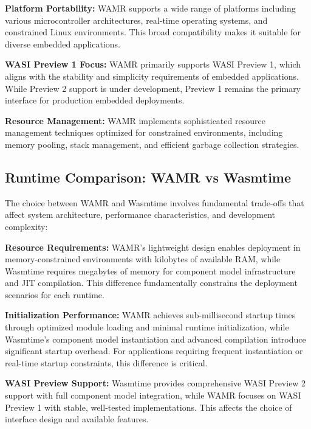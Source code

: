\textbf{Platform Portability:} WAMR supports a wide range of platforms including various microcontroller architectures, real-time operating systems, and constrained Linux environments. This broad compatibility makes it suitable for diverse embedded applications.

\textbf{WASI Preview 1 Focus:} WAMR primarily supports WASI Preview 1, which aligns with the stability and simplicity requirements of embedded applications. While Preview 2 support is under development, Preview 1 remains the primary interface for production embedded deployments.

\textbf{Resource Management:} WAMR implements sophisticated resource management techniques optimized for constrained environments, including memory pooling, stack management, and efficient garbage collection strategies.

\subsection{Runtime Comparison: WAMR vs Wasmtime}
\label{subsec:runtime-comparison}

The choice between WAMR and Wasmtime involves fundamental trade-offs that affect system architecture, performance characteristics, and development complexity:


\textbf{Resource Requirements:}
WAMR's lightweight design enables deployment in memory-constrained environments with kilobytes of available RAM, while Wasmtime requires megabytes of memory for component model infrastructure and JIT compilation. This difference fundamentally constrains the deployment scenarios for each runtime.

\textbf{Initialization Performance:}
WAMR achieves sub-millisecond startup times through optimized module loading and minimal runtime initialization, while Wasmtime's component model instantiation and advanced compilation introduce significant startup overhead. For applications requiring frequent instantiation or real-time startup constraints, this difference is critical.

\textbf{WASI Preview Support:}
Wasmtime provides comprehensive WASI Preview 2 support with full component model integration, while WAMR focuses on WASI Preview 1 with stable, well-tested implementations. This affects the choice of interface design and available features.

